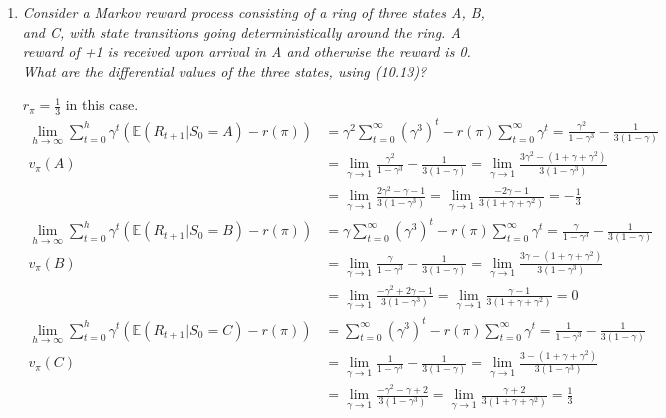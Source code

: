 \documentclass[12pt,a4paper]{article}
\begin{document}
\begin{enumerate}
  \item \textit{Consider a Markov reward process consisting of a ring of three states A, B,
  and C, with state transitions going deterministically around the ring. A reward of +1 is
  received upon arrival in A and otherwise the reward is 0. What are the differential values
  of the three states, using (10.13)?}

  $r_\pi = \frac{1}{3}$ in this case.
  \begin{align*}
    \lim\limits_{h \rightarrow \infty}
    \sum\limits_{t = 0}^h \gamma^t(\mathbb{E}(R_{t + 1} | S_0 = A) - r(\pi))
    &= \gamma^2 \sum\limits_{t = 0}^\infty (\gamma^3)^t - r(\pi)
    \sum\limits_{t = 0}^\infty \gamma^t
    = \frac{\gamma^2}{1 - \gamma^3} - \frac{1}{3(1 - \gamma)}\\
    v_\pi(A) &= \lim\limits_{\gamma \rightarrow 1}
    \frac{\gamma^2}{1 - \gamma^3} - \frac{1}{3(1 - \gamma)}
    = \lim\limits_{\gamma \rightarrow 1}
    \frac{3 \gamma^2 - (1 + \gamma + \gamma^2)}{3(1 - \gamma^3)}\\
    &= \lim\limits_{\gamma \rightarrow 1}
    \frac{2\gamma^2 - \gamma - 1}{3(1 - \gamma^3)}
    = \lim\limits_{\gamma \rightarrow 1} \frac{-2 \gamma - 1}{3(1 + \gamma + \gamma^2)}
    = -\frac{1}{3}\\
    \lim\limits_{h \rightarrow \infty}
    \sum\limits_{t = 0}^h \gamma^t(\mathbb{E}(R_{t + 1} | S_0 = B) - r(\pi))
    &= \gamma \sum\limits_{t = 0}^\infty (\gamma^3)^t - r(\pi)
    \sum\limits_{t = 0}^\infty \gamma^t
    = \frac{\gamma}{1 - \gamma^3} - \frac{1}{3(1 - \gamma)}\\
    v_\pi(B) &= \lim\limits_{\gamma \rightarrow 1}
    \frac{\gamma}{1 - \gamma^3} - \frac{1}{3(1 - \gamma)}
    = \lim\limits_{\gamma \rightarrow 1}
    \frac{3 \gamma - (1 + \gamma + \gamma^2)}{3(1 - \gamma^3)}\\
    &= \lim\limits_{\gamma \rightarrow 1}
    \frac{-\gamma^2 + 2 \gamma - 1}{3(1 - \gamma^3)}
    = \lim\limits_{\gamma \rightarrow 1} \frac{\gamma - 1}{3(1 + \gamma + \gamma^2)}
    = 0\\
    \lim\limits_{h \rightarrow \infty}
    \sum\limits_{t = 0}^h \gamma^t(\mathbb{E}(R_{t + 1} | S_0 = C) - r(\pi))
    &= \sum\limits_{t = 0}^\infty (\gamma^3)^t - r(\pi)
    \sum\limits_{t = 0}^\infty \gamma^t
    = \frac{1}{1 - \gamma^3} - \frac{1}{3(1 - \gamma)}\\
    v_\pi(C) &= \lim\limits_{\gamma \rightarrow 1}
    \frac{1}{1 - \gamma^3} - \frac{1}{3(1 - \gamma)}
    = \lim\limits_{\gamma \rightarrow 1}
    \frac{3 - (1 + \gamma + \gamma^2)}{3(1 - \gamma^3)}\\
    &= \lim\limits_{\gamma \rightarrow 1}
    \frac{-\gamma^2 - \gamma  + 2}{3(1 - \gamma^3)}
    = \lim\limits_{\gamma \rightarrow 1} \frac{\gamma + 2}{3(1 + \gamma + \gamma^2)}
    = \frac{1}{3}\\
  \end{align*}
\end{enumerate}
\end{document}
